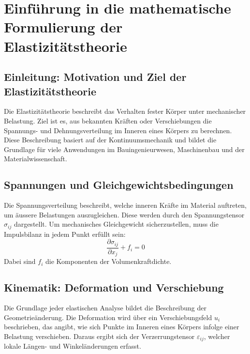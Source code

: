 %
%
%
%
\section{Einführung in die mathematische Formulierung der Elastizitätstheorie}
\subsection{Einleitung: Motivation und Ziel der Elastizitätstheorie}
Die Elastizitätstheorie beschreibt das Verhalten fester Körper unter mechanischer Belastung. 
Ziel ist es, aus bekannten Kräften oder Verschiebungen die Spannungs- und Dehnungsverteilung im Inneren eines Körpers zu berechnen. 
Diese Beschreibung basiert auf der Kontinuumsmechanik und bildet die Grundlage für viele Anwendungen im Bauingenieurwesen, Maschinenbau und der Materialwissenschaft.

\subsection{Spannungen und Gleichgewichtsbedingungen}
Die Spannungsverteilung beschreibt, welche inneren Kräfte im Material auftreten, um äussere Belastungen auszugleichen. 
Diese werden durch den Spannungstensor $\sigma_{ij}$ dargestellt. 
Um mechanisches Gleichgewicht sicherzustellen, muss die Impulsbilanz in jedem Punkt erfüllt sein:
	\begin{equation}
		\frac{\partial \sigma_{ij}}{\partial x_j} + f_i = 
		0
	\end{equation}
Dabei sind $f_i$ die Komponenten der Volumenkraftdichte.

\subsection{Kinematik: Deformation und Verschiebung}
Die Grundlage jeder elastischen Analyse bildet die Beschreibung der Geometrieänderung. 
Die Deformation wird über ein Verschiebungsfeld $u_i$ beschrieben, das angibt, wie sich Punkte im Inneren eines Körpers infolge einer Belastung verschieben. 
Daraus ergibt sich der Verzerrungstensor $\varepsilon_{ij}$, welcher lokale Längen- und Winkeländerungen erfasst.

